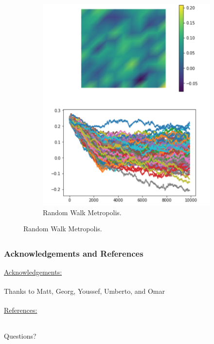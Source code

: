 \documentclass[9pt]{beamer}
\begin{document}
\begin{frame}
\begin{figure}
\begin{subfigure}{0.3\textwidth}
	\includegraphics[scale = 0.3]{pCN_noObs.png}
	\caption{Random Walk Metropolis.}
\end{subfigure}
\end{figure}

\end{frame}


\subsection{}
\begin{frame}[allowframebreaks]
\frametitle{Acknowledgements and References}
\underline{Acknowledgements:} \\~\\
Thanks to Matt, Georg, Youssef, Umberto, and Omar
\\~\\

\nocite{fenics2} 
\nocite{hippylib}
\nocite{numopt}
\underline{References:} \\~\\
%
\small{
\printbibliography
}
\end{frame}



\begin{frame}
\vspace{3cm}
\Huge{\centerline{Questions?}}
\vspace{3cm}
\end{frame}

\end{document}

